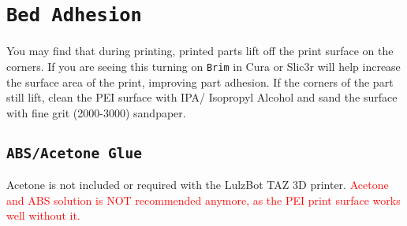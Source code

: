 


\section{\texttt{Bed Adhesion}}
You may find that during printing, printed parts lift off the print surface on the corners. If you are seeing this turning on \texttt{Brim} in Cura or Slic3r will help increase the surface area of the print, improving part adhesion. If the corners of the part still lift, clean the PEI surface with IPA/ Isopropyl Alcohol and sand the surface with fine grit (2000-3000) sandpaper.


\subsection{\texttt{ABS/Acetone Glue}}
\label{sec:ABS/Acetone Glue}

Acetone is not included or required with the LulzBot TAZ 3D printer. \textcolor{red}{Acetone and ABS solution is NOT recommended anymore, as the PEI print surface works well without it.}

